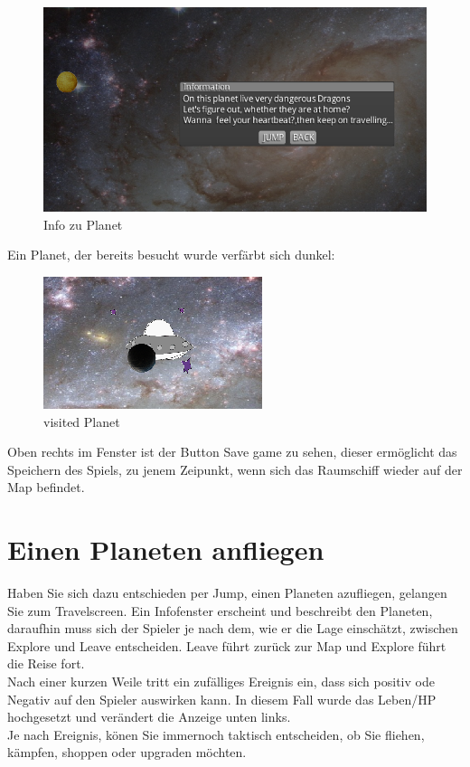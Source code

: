 \documentclass[fontsize=12pt,paper=a4,twoside]{scrartcl}
\begin{document}
\begin{figure}[htp]
	\centering
	\includegraphics[width=1.00\linewidth]{pics/infoPlanet2.png} %
	\caption{Info zu Planet}
	\label{fig1}
\end{figure}

Ein Planet, der bereits besucht wurde verfärbt sich dunkel:

\begin{figure}[htp]
	\centering
	\includegraphics[width=0.30\linewidth]{pics/visitedPlanet.png}
	\caption{visited Planet}
	\label{fig1}
\end{figure}

Oben rechts im Fenster ist der Button Save game zu sehen, dieser ermöglicht das Speichern des Spiels, zu jenem Zeipunkt, wenn sich das Raumschiff wieder auf der Map befindet.

\section{Einen Planeten anfliegen}
Haben Sie sich dazu entschieden per Jump, einen Planeten azufliegen, gelangen Sie zum Travelscreen.
Ein Infofenster erscheint und beschreibt den Planeten, daraufhin muss sich der Spieler je nach dem, wie er die Lage einschätzt, zwischen Explore und Leave entscheiden. Leave führt zurück zur Map und Explore führt die Reise fort.\\
Nach einer kurzen Weile tritt ein zufälliges Ereignis ein, dass sich positiv ode Negativ auf den Spieler auswirken kann. In diesem Fall wurde das Leben/HP hochgesetzt und verändert die Anzeige unten links.\\
Je nach Ereignis, könen Sie immernoch taktisch entscheiden, ob Sie fliehen, kämpfen, shoppen oder upgraden möchten.
\end{document}
